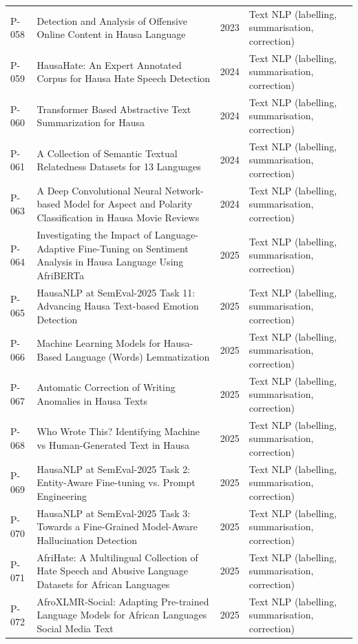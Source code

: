 \begin{longtable}{@{}p{} p{} p{} p{}@{}}
P-058 & Detection and Analysis of Offensive Online Content in Hausa Language & 2023 & Text NLP (labelling, summarisation, correction) \\
P-059 & HausaHate: An Expert Annotated Corpus for Hausa Hate Speech Detection & 2024 & Text NLP (labelling, summarisation, correction) \\
P-060 & Transformer Based Abstractive Text Summarization for Hausa & 2024 & Text NLP (labelling, summarisation, correction) \\
P-061 & A Collection of Semantic Textual Relatedness Datasets for 13 Languages & 2024 & Text NLP (labelling, summarisation, correction) \\
P-063 & A Deep Convolutional Neural Network-based Model for Aspect and Polarity Classification in Hausa Movie Reviews & 2024 & Text NLP (labelling, summarisation, correction) \\
P-064 & Investigating the Impact of Language-Adaptive Fine-Tuning on Sentiment Analysis in Hausa Language Using AfriBERTa & 2025 & Text NLP (labelling, summarisation, correction) \\
P-065 & HausaNLP at SemEval-2025 Task 11: Advancing Hausa Text-based Emotion Detection & 2025 & Text NLP (labelling, summarisation, correction) \\
P-066 & Machine Learning Models for Hausa-Based Language (Words) Lemmatization & 2025 & Text NLP (labelling, summarisation, correction) \\
P-067 & Automatic Correction of Writing Anomalies in Hausa Texts & 2025 & Text NLP (labelling, summarisation, correction) \\
P-068 & Who Wrote This? Identifying Machine vs Human-Generated Text in Hausa & 2025 & Text NLP (labelling, summarisation, correction) \\
P-069 & HausaNLP at SemEval-2025 Task 2: Entity-Aware Fine-tuning vs. Prompt Engineering & 2025 & Text NLP (labelling, summarisation, correction) \\
P-070 & HausaNLP at SemEval-2025 Task 3: Towards a Fine-Grained Model-Aware Hallucination Detection & 2025 & Text NLP (labelling, summarisation, correction) \\
P-071 & AfriHate: A Multilingual Collection of Hate Speech and Abusive Language Datasets for African Languages & 2025 & Text NLP (labelling, summarisation, correction) \\
P-072 & AfroXLMR-Social: Adapting Pre-trained Language Models for African Languages Social Media Text & 2025 & Text NLP (labelling, summarisation, correction) \\

\end{longtable}
